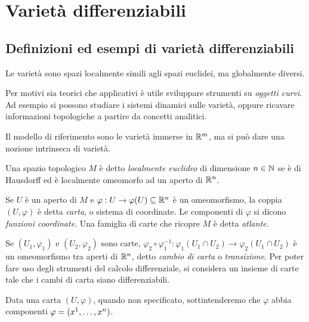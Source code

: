 \chapter{Varietà differenziabili}

\section{Definizioni ed esempi di varietà differenziabili}
 
 Le varietà sono spazi localmente simili agli spazi euclidei, ma globalmente diversi.
 
 Per motivi sia teorici che applicativi è utile sviluppare strumenti su \emph{oggetti curvi}.
 Ad esempio si possono studiare i sistemi dinamici sulle varietà, oppure ricavare
 informazioni topologiche a partire da concetti analitici.
 
 Il modello di riferimento sono le varietà immerse in $\R^m$, ma si può dare
 una nozione intrinseca di varietà.
 
 \begin{definition} 
 Una spazio topologico $M$ è detto \emph{localmente euclideo} di dimensione $n\in\N$ se è di Hausdorff ed è localmente omeomorfo ad un aperto di $\R^n$.
 \end{definition}
 
 \begin{definition}   
 Se $U$ è un aperto di $M$ e $\varphi:U\to \varphi(U)\subseteq \R^n$
 è un omeomorfismo, la coppia $(U, \varphi)$ è detta \emph{carta}, o sistema di coordinate.
 Le componenti di $\varphi$ si dicono \emph{funzioni coordinate}. Una famiglia di carte
 che ricopre $M$ è detta \emph{atlante}.
 \end{definition}
 
 Se $(U_1, \varphi_1)$ e $(U_2, \varphi_2)$ sono carte, $\varphi_2\circ\varphi_1^{-1}:\varphi_1(U_1\cap U_2)\to\varphi_2(U_1\cap U_2)$
 è un omeomorfismo tra aperti di $\R^n$, detto \emph{cambio di carta} o \emph{transizione}.
 Per poter fare uso degli strumenti del calcolo differenziale, si considera un insieme
 di carte tale che i cambi di carta siano differenziabili.
 
\begin{remark}
	Data una carta $(U,\varphi)$, quando non specificato, sottintenderemo che $\varphi$ abbia componenti $\varphi=(\seqa xn,)$.
\end{remark}

